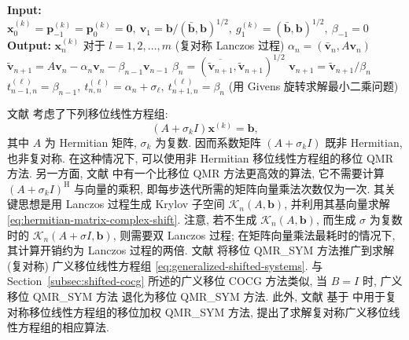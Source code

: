 \begin{algorithm}[H]\caption{{移位 QMR\_SYM 方法 (注意: $(\bar{\bm a},\bm b)=\bm a^{\top}\bm b$)}}\label{alg:shifted-qmr-sym}\begin{algorithmic}[1]
\Statex\textbf{Input:} $\bm x_0^{(k)}=\bm p_{-1}^{(k)}=\bm p_0^{(k)}=\bm0,\ \bm v_1=\bm b/(\bar{\bm b},\bm b)^{1/2},\ g_1^{(k)}=(\bar{\bm b},\bm b)^{1/2},\ \beta_{-1}=0$
\Statex\textbf{Output:} $\bm x_n^{(k)}$ {对于} $l=1,2,\ldots,m$
\State ({复对称 Lanczos 过程})
\State $\alpha_n=(\bar{\bm v}_n,A\bm v_n)$
\State $\widetilde{\bm v}_{n+1}=A\bm v_n-\alpha_n\bm v_n-\beta_{n-1}\bm v_{n-1}$
\State $\beta_n=(\overline{\widetilde{\bm v}_{n+1}},\widetilde{\bm v}_{n+1})^{1/2}$
\State $\bm v_{n+1}=\widetilde{\bm v}_{n+1}/\beta_n$
\State $t_{n-1,n}^{(\ell)}=\beta_{n-1},\ t_{n,n}^{(\ell)}=\alpha_n+\sigma_{\ell},\ t_{n+1,n}^{(\ell)}=\beta_n$
\State ({用 Givens 旋转求解最小二乘问题})
\EndFor\end{algorithmic}\end{algorithm}
{文献  考虑了下列移位线性方程组:}
\begin{equation}\label{eq:hermitian-matrix-complex-shift}\label{srcpage:printed-176}(A+\sigma_k I)\bm x^{(k)}=\bm b,\end{equation}
{其中 $A$ 为 Hermitian 矩阵, $\sigma_k$ 为复数. 因而系数矩阵 $(A+\sigma_k I)$ 既非 Hermitian, 也非复对称. 在这种情况下, 可以使用非 Hermitian 移位线性方程组的移位 QMR 方法. 另一方面, 文献  中有一个比移位 QMR 方法更高效的算法, 它不需要计算 $(A+\sigma_k I)^{\mathrm H}$ 与向量的乘积, 即每步迭代所需的矩阵向量乘法次数仅为一次. 其关键思想是用 Lanczos 过程生成 Krylov 子空间 $\mathcal K_n(A,\bm b)$, 并利用其基向量求解 \eqref{eq:hermitian-matrix-complex-shift}. 注意, 若不生成 $\mathcal K_n(A,\bm b)$, 而生成 $\sigma$ 为复数时的 $\mathcal K_n(A+\sigma I,\bm b)$, 则需要双 Lanczos 过程; 在矩阵向量乘法最耗时的情况下, 其计算开销约为 Lanczos 过程的两倍.}
{文献  将移位 QMR\_SYM 方法推广到求解 (复对称) 广义移位线性方程组 \eqref{eq:generalized-shifted-systems}. 与 Section\ \ref{subsec:shifted-cocg} 所述的广义移位 COCG 方法类似, 当 $B=I$ 时, 广义移位 QMR\_SYM 方法  退化为移位 QMR\_SYM 方法. 此外, 文献  基于  中用于复对称移位线性方程组的移位加权 QMR\_SYM 方法, 提出了求解复对称广义移位线性方程组的相应算法.}
